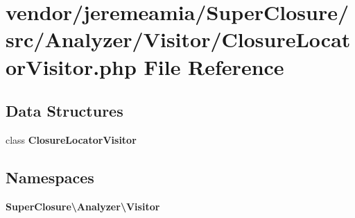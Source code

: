\section{vendor/jeremeamia/\+Super\+Closure/src/\+Analyzer/\+Visitor/\+Closure\+Locator\+Visitor.php File Reference}
\label{_closure_locator_visitor_8php}
\subsection*{Data Structures}
\begin{DoxyCompactItemize}
\item 
class {\bf Closure\+Locator\+Visitor}
\end{DoxyCompactItemize}
\subsection*{Namespaces}
\begin{DoxyCompactItemize}
\item 
 {\bf Super\+Closure\textbackslash{}\+Analyzer\textbackslash{}\+Visitor}
\end{DoxyCompactItemize}
